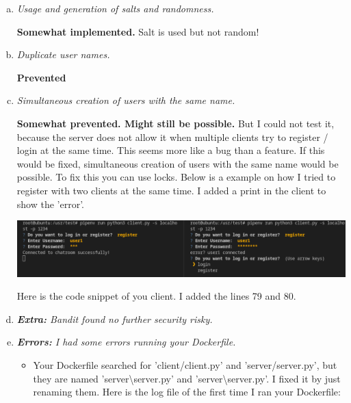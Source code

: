 \begin{enumerate}[1.]
\begin{enumerate}[(a)]
        \item {\itshape Usage and generation of salts and randomness.}
        
        \textbf{Somewhat implemented.} Salt is used but not random!
        

        \item {\itshape Duplicate user names.}
        
        \textbf{Prevented}
        
        
        \item {\itshape Simultaneous creation of users with the same name.}
        
        \textbf{Somewhat prevented. Might still be possible.} But I could not test it, because the server does not allow it when multiple clients try to register / login at the same time. This seems more like a bug than a feature. If this would be fixed, simultaneous creation of users with the same name would be possible. To fix this you can use locks.
        Below is a example on how I tried to register with two clients at the same time. I added a print in the client to show the 'error'.
        
        \includegraphics[width=\linewidth]{src/u6/error2.png}
        
        Here is the code snippet of you client. I added the lines 79 and 80.
        

\newpage
        \item {\itshape \textbf{Extra:} Bandit found no further security risky.}
        
        \item {\itshape \textbf{Errors:} I had some errors running your Dockerfile.}
        \begin{itemize}
            \item Your Dockerfile searched for 'client/client.py' and 'server/server.py', but they are named 'server\textbackslash server.py' and 'server\textbackslash server.py'. I fixed it by just renaming them. Here is the log file of the first time I ran your Dockerfile:
            


\end{itemize}
\end{enumerate}
\end{enumerate}
